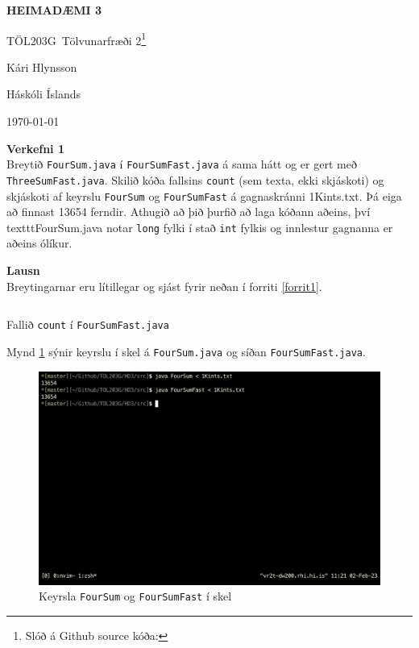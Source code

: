 \documentclass[12pt, a4paper]{article}
\title{}
\newcommand{\doctitle}{\uppercase{Heimadæmi 3}}
\newcommand{\coursename}{Tölvunarfræði 2\footnote{Slóð á Github source kóða: }}
\newcommand{\coursenum}{TÖL203G}
\begin{document}
\thispagestyle{plain}
\centerline{\bfseries\Large\doctitle}
\medskip
\centerline{\large\coursenum\ \coursename}
\bigskip

\centerline{\large Kári Hlynsson}
\bigskip
\centerline{Háskóli Íslands}
\medskip
\centerline{\today}

\bigskip

\noindent
\textbf{\large Verkefni 1} \medskip \\
Breytið \texttt{FourSum.java} í \texttt{FourSumFast.java} á sama hátt og er
gert með \texttt{ThreeSumFast.java}. Skilið kóða fallsins \texttt{count}
(sem texta, ekki skjáskoti) og skjáskoti af keyrslu \texttt{FourSum} og
\texttt{FourSumFast} á gagnaskránni 1Kints.txt. Þá eiga að finnast 13654
ferndir. Athugið að þið þurfið að laga kóðann aðeins, því texttt{FourSum.java}
notar \texttt{long} fylki í stað \texttt{int} fylkis og innlestur gagnanna er aðeins ólíkur.

\medskip
\noindent
\textbf{\large Lausn} \medskip \\
Breytingarnar eru lítillegar og sjást fyrir neðan í forriti \ref{forrit1}.

\begin{listing}[ht!]
    \centering
    \inputminted[firstline=49, lastline=65, linenos]{java}{../src/V1/FourSumFast.java}
    \caption{Fallið \texttt{count} í \texttt{FourSumFast.java}}
    \label{forrit1}
\end{listing}

\noindent
Mynd \ref{mynd1} sýnir keyrslu í skel á \texttt{FourSum.java} og síðan \texttt{FourSumFast.java}.

\newpage
\begin{figure}[ht!]
   \centering
   \includegraphics[width=\textwidth]{img/foursum_keyrsla.png} 
   \caption{Keyrsla \texttt{FourSum} og \texttt{FourSumFast} í skel}
   \label{mynd1}
\end{figure}
\end{document}
